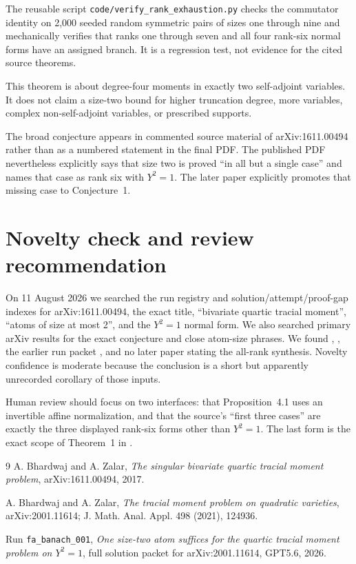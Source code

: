 \documentclass[11pt]{article}
\begin{document}
The reusable script \texttt{code/verify\_rank\_exhaustion.py} checks the
commutator identity on 2,000 seeded random symmetric pairs of sizes one
through nine and mechanically verifies that ranks one through seven and all
four rank-six normal forms have an assigned branch.  It is a regression test,
not evidence for the cited source theorems.

This theorem is about degree-four moments in exactly two self-adjoint
variables.  It does not claim a size-two bound for higher truncation degree,
more variables, complex non-self-adjoint variables, or prescribed supports.

The broad conjecture appears in commented source material of
arXiv:1611.00494 rather than as a numbered statement in the final PDF.  The
published PDF nevertheless explicitly says that size two is proved ``in all
but a single case'' and names that case as rank six with $Y^2=1$.  The later
paper \cite{BZ20} explicitly promotes that missing case to Conjecture~1.

\section{Novelty check and review recommendation}

On 11 August 2026 we searched the run registry and solution/attempt/proof-gap
indexes for arXiv:1611.00494, the exact title, ``bivariate quartic tracial
moment'', ``atoms of size at most 2'', and the $Y^2=1$ normal form.  We also
searched primary arXiv results for the exact conjecture and close atom-size
phrases.  We found \cite{BZ17}, \cite{BZ20}, the earlier run packet
\cite{PriorPacket}, and no later paper stating the all-rank synthesis.
Novelty confidence is moderate because the conclusion is a short but
apparently unrecorded corollary of those inputs.

Human review should focus on two interfaces: that Proposition~4.1 uses an
invertible affine normalization, and that the source's “first three cases” are
exactly the three displayed rank-six forms other than $Y^2=1$.  The last form
is the exact scope of Theorem~1 in \cite{PriorPacket}.

\begin{thebibliography}{9}
A. Bhardwaj and A. Zalar,
\emph{The singular bivariate quartic tracial moment problem},
arXiv:1611.00494, 2017.

A. Bhardwaj and A. Zalar,
\emph{The tracial moment problem on quadratic varieties},
arXiv:2001.11614; J. Math. Anal. Appl. 498 (2021), 124936.

Run \texttt{fa\_banach\_001},
\emph{One size-two atom suffices for the quartic tracial moment problem on
$Y^2=1$}, full solution packet for arXiv:2001.11614, GPT5.6, 2026.
\end{thebibliography}
\end{document}
